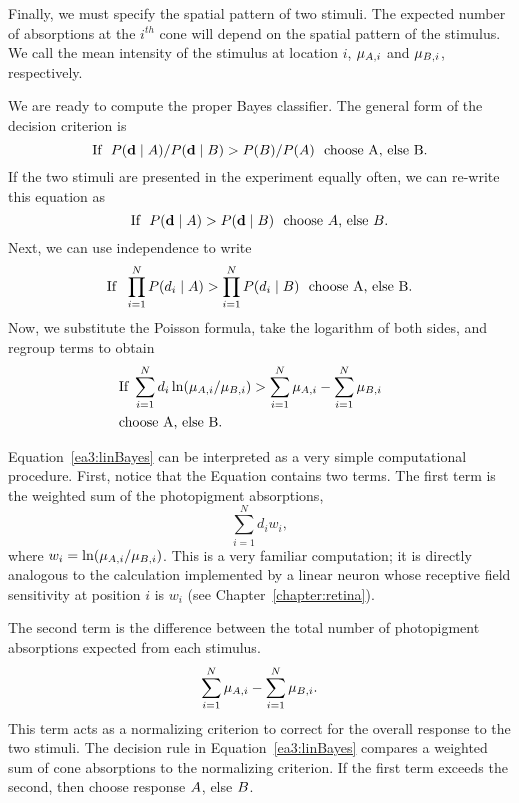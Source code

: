 Finally, we must specify the spatial pattern of two stimuli.  The
expected number of absorptions at the $i^{th}$ cone will depend on the
spatial pattern of the stimulus.  We call the mean intensity of the
stimulus at location $i$, $\mbox{$\mu_{A,i}$}$ and $\mbox{$\mu_{B,i}$}$, respectively.

We are ready to compute the proper Bayes classifier.  The general
form of the decision criterion is
\begin{equation}
\mbox{If}~~P(\mbox{${\bf d}$} \mid \mbox{$A$}) / P(\mbox{${\bf d}$} \mid \mbox{$B$}) 
  > P( \mbox{$B$} ) / P( \mbox{$A$} )~~
\mbox{choose A, else B}.
\end{equation}
If the two stimuli are presented in the experiment equally often, we
can re-write this equation as
\begin{equation}
\mbox{If}~~P( \mbox{${\bf d}$} \mid \mbox{$A$} ) > P( \mbox{${\bf d}$} \mid \mbox{$B$} )~~
\mbox{choose \mbox{$A$}, else \mbox{$B$}}.
\end{equation}
Next, we can use independence to write
\begin{equation}
\mbox{If}~~\prod_{i=1}^N P(d_i \mid \mbox{$A$}) > 
  \prod_{i=1}^N P(d_i \mid \mbox{$B$})~~\mbox{choose A, else B}.
\end{equation}
Now, we substitute the Poisson formula, take the logarithm of both
sides, and regroup terms to obtain
\begin{eqnarray}
\label{ea3:linBayes}
& \mbox{If}~
\sum_{i=1}^{N} d_i \ln (\mbox{$\mu_{A,i}$} / \mbox{$\mu_{B,i}$}) > 
\sum_{i=1}^{N} \mbox{$\mu_{A,i}$} - \sum_{i=1}^{N} \mbox{$\mu_{B,i}$}~ & \\
& \mbox{choose A, else B}. \nonumber &
\end{eqnarray}

Equation~\ref{ea3:linBayes} can be interpreted as a very simple
computational procedure.  First, notice that the Equation contains two
terms.  The first term is the weighted sum of the photopigment absorptions,
\begin{equation}
\label{ea3:linClass}
\sum_{i=1}^{N} d_i w_i ,
\end{equation}
where $w_i= \ln ( \mbox{$\mu_{A,i}$} / \mbox{$\mu_{B,i}$} )$.  This is a very familiar
computation; it is directly analogous to the calculation implemented
by a linear neuron whose receptive field sensitivity at position $i$
is $w_i$ (see Chapter~\ref{chapter:retina}).

The second term is the difference between the total number of
photopigment absorptions expected from each stimulus.
\[
\sum_{i=1}^{N} \mbox{$\mu_{A,i}$} - \sum_{i=1}^{N} \mbox{$\mu_{B,i}$} .
\]
This term acts as a normalizing criterion to correct for the
overall response to the two stimuli.  The decision rule in
Equation~\ref{ea3:linBayes} compares a weighted sum of cone
absorptions to the normalizing criterion. If the first term exceeds the
second, then choose response $\mbox{$A$}$, else $\mbox{$B$}$.

